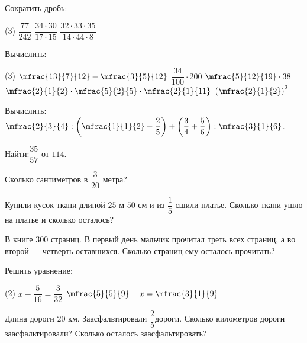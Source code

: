 \begin{class}[number=4]
	\begin{listofex}
		\item Сократить дробь:
		\begin{tasks}(3)
			\task \( \dfrac{77}{242} \)
			\task \( \dfrac{34\cdot30}{17\cdot15} \)
			\task \( \dfrac{32\cdot33\cdot35}{14\cdot44\cdot8} \)
		\end{tasks}
		\item Вычислить:
		\begin{tasks}(3)
			\task \( \mfrac{13}{7}{12}-\mfrac{3}{5}{12} \)
			\task \( \dfrac{34}{100}\cdot200 \)
			\task \( \mfrac{5}{12}{19}\cdot38 \)
			\task \( \mfrac{2}{1}{2}\cdot\mfrac{5}{2}{5}\cdot\mfrac{2}{1}{11}\)
			\task \( \left( \mfrac{2}{1}{2} \right)^2 \)
		\end{tasks}
		\item Вычислить:\quad\( \mfrac{2}{3}{4}:\left( \mfrac{1}{1}{2}-\dfrac{2}{5} \right)+\left( \dfrac{3}{4}+\dfrac{5}{6} \right):\mfrac{3}{1}{6} \).
		\item Найти:\quad\( \dfrac{35}{57} \) от \( 114 \).
		\item Сколько сантиметров в \( \dfrac{3}{20} \) метра?
		\item Купили кусок ткани длиной \( 25 \) м \( 50 \) см и из \( \dfrac{1}{5} \) сшили платье. Сколько ткани ушло на платье и сколько осталось?
		\item В книге \( 300 \) страниц. В первый день мальчик прочитал треть всех страниц, а во второй --- четверть \underline{оставшихся}. Сколько страниц ему осталось прочитать?
		\item Решить уравнение:
		\begin{tasks}(2)
			\task \( x-\dfrac{5}{16}=\dfrac{3}{32} \)
			\task \( \mfrac{5}{5}{9}-x=\mfrac{3}{1}{9} \)
		\end{tasks}
	\end{listofex}
\end{class}
%
%
\begin{homework}[number=2]
	\begin{listofex}
		\item Длина дороги 20 км. Заасфальтировали \( \dfrac{2}{5} \)дороги. Сколько километров дороги заасфальтировали? Сколько осталось заасфальтировать?
	\end{listofex}
\end{homework}
%
